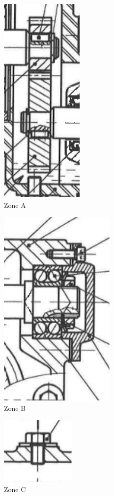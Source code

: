 \begin{figure}[!h]
 \centering\includegraphics[width=0.35\linewidth]{img/Moto_reducteur_frein_A}
 \caption{Zone A}
 \label{img_zoneA_cor}
\end{figure}

\newpage

\cor

\begin{figure}[!h]
 \centering\includegraphics[width=0.4\linewidth]{img/Moto_reducteur_frein_B}
 \caption{Zone B}
 \label{img_zoneB_cor}
\end{figure}

\cor

\begin{figure}[!h]
 \centering\includegraphics[width=0.4\linewidth]{img/Moto_reducteur_frein_C}
 \caption{Zone C}
 \label{img_zoneC_cor}
\end{figure}





